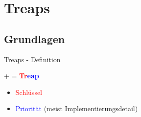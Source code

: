 \documentclass[t]{beamer}
\theoremstyle{plain}
\begin{document}
\section{Treaps}
\subsection{Grundlagen}
\begin{frame}{Treaps - Definition}
    \begin{center}
         +  = \textbf{\textcolor{red}{Tr}\textcolor{blue}{eap}}
    \end{center}
    \begin{itemize}
        \item<2-> \textcolor{red}{Schlüssel}
        \item<3-> \textcolor{blue}{Priorität} (meist Implementierungsdetail)
    \end{itemize}
    \vspace{1em}
    \hfill{}
\end{frame}
\end{document}
